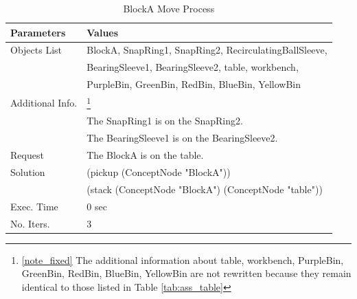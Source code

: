 \begin{table}[!htbp]
  \centering
  \caption{BlockA Move Process}\label{tab:ass_A_2}
  \medskip
\begin{tabular}{ll}
\toprule
\textbf{Parameters} &  \textbf{Values}  \\
\midrule
\rowcolor{gray!25}
Objects List &  BlockA, SnapRing1, SnapRing2, RecirculatingBallSleeve, \\
\rowcolor{gray!25}
& BearingSleeve1, BearingSleeve2, table, workbench, \\
\rowcolor{gray!25}
&  PurpleBin, GreenBin, RedBin, BlueBin, YellowBin \\
Additional Info. & \footnote{\ref{note_fixed} The additional information about table, workbench, PurpleBin, GreenBin, RedBin, BlueBin, YellowBin are not rewritten because they remain identical to those listed in Table \ref{tab:ass_table}} \\
& The SnapRing1 is on the SnapRing2. \\
& The BearingSleeve1 is on the BearingSleeve2. \\
\rowcolor{gray!25}
Request & The BlockA is on the table. \\
Solution & (pickup (ConceptNode "BlockA")) \\
& (stack (ConceptNode "BlockA") (ConceptNode "table")) \\
\rowcolor{gray!25}
Exec. Time & 0 sec \\
No. Iters. & 3 \\	
\bottomrule
\end{tabular}
\end{table}


